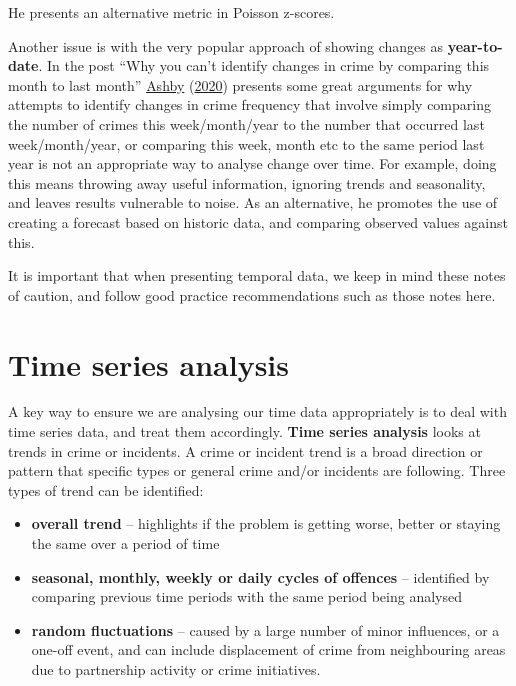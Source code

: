 \documentclass[
]{book}
\providecommand{\tightlist}{%
  \setlength{\itemsep}{0pt}\setlength{\parskip}{0pt}}
\begin{document}
He presents an alternative metric in Poisson z-scores.

Another issue is with the very popular approach of showing changes as \textbf{year-to-date}. In the post ``Why you can't identify changes in crime by comparing this month to last month'' \protect\hyperlink{ref-Ashby_2020}{Ashby} (\protect\hyperlink{ref-Ashby_2020}{2020}) presents some great arguments for why attempts to identify changes in crime frequency that involve simply comparing the number of crimes this week/month/year to the number that occurred last week/month/year, or comparing this week, month etc to the same period last year is not an appropriate way to analyse change over time. For example, doing this means throwing away useful information, ignoring trends and seasonality, and leaves results vulnerable to noise. As an alternative, he promotes the use of creating a forecast based on historic data, and comparing observed values against this.

It is important that when presenting temporal data, we keep in mind these notes of caution, and follow good practice recommendations such as those notes here.

\hypertarget{time-series-analysis}{%
\section{Time series analysis}\label{time-series-analysis}}

A key way to ensure we are analysing our time data appropriately is to deal with time series data, and treat them accordingly. \textbf{Time series analysis} looks at trends in crime or incidents. A crime or incident trend is a broad direction or pattern that specific types or general crime and/or incidents are following. Three types of trend can be identified:

\begin{itemize}
\tightlist
\item
  \textbf{overall trend} -- highlights if the problem is getting worse, better or staying the same over a period of time
\item
  \textbf{seasonal, monthly, weekly or daily cycles of offences} -- identified by comparing previous time periods with the same period being analysed
\item
  \textbf{random fluctuations} -- caused by a large number of minor influences, or a one-off event, and can include displacement of crime from neighbouring areas due to partnership activity or crime initiatives.
\end{itemize}
\end{document}
